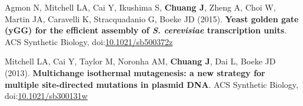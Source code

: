 \documentclass[11pt, a4paper]{article}
\begin{document}
\begin{description}[topsep=2pt, align=right, leftmargin=!, labelwidth=\widthof{\textbf{2018}}]
    \item [2015] Agmon N, Mitchell LA, Cai Y, Ikushima S, \textbf{Chuang J}, Zheng A, Choi W, Martin JA, Caravelli K, Stracquadanio G, Boeke JD (2015). \textbf{Yeast golden gate (yGG) for the efficient assembly of \textit{S. cerevisiae} transcription units}. ACS Synthetic Biology, doi:\href{https://doi.org/10.1021/sb500372z}{10.1021/sb500372z}
    \item [2013] Mitchell LA, Cai Y, Taylor M, Noronha AM, \textbf{Chuang J}, Dai L, Boeke JD (2013). \textbf{Multichange isothermal mutagenesis: a new strategy for multiple site-directed mutations in plasmid DNA}. ACS Synthetic Biology, doi:\href{https://doi.org/10.1021/sb300131w}{10.1021/sb300131w}
\end{description}

\end{document}
